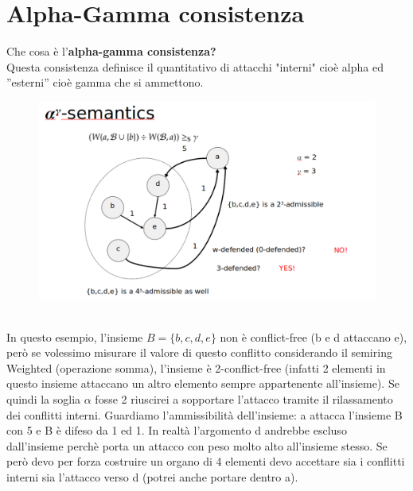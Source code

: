 \section{Alpha-Gamma consistenza}
Che cosa è l’\textbf{alpha-gamma consistenza?}
\\ Questa consistenza definisce il quantitativo di attacchi "interni" cioè alpha ed ”esterni” cioè gamma che si ammettono.
\begin{figure}[htp]
	\centering
    \includegraphics[width=12cm, keepaspectratio]{img/Cap6/cons2.png}
\end{figure}
\\In questo esempio, l’insieme $B = \{b, c, d, e\}$ non è conflict-free (b e d attaccano e), però se volessimo misurare il valore di questo conflitto considerando il semiring Weighted (operazione somma), l’insieme è 2-conflict-free (infatti 2 elementi in questo insieme attaccano un altro elemento sempre appartenente all’insieme). Se quindi la soglia $\alpha$ fosse 2 riuscirei a sopportare l’attacco
tramite il rilassamento dei conflitti interni. Guardiamo l’ammissibilità dell’insieme: a attacca l’insieme B con 5 e B è difeso da 1 ed 1. In realtà l’argomento d andrebbe escluso dall’insieme
perchè porta un attacco con peso molto alto all’insieme stesso. Se però devo per forza costruire un organo di 4 elementi devo accettare sia i conflitti interni sia l’attacco verso d (potrei anche portare dentro a).

